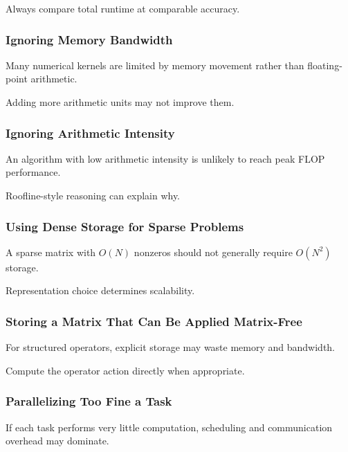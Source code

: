 Always compare total runtime at comparable accuracy.

\subsubsection{Ignoring Memory Bandwidth}

Many numerical kernels are limited by memory movement rather than floating-
point arithmetic.

Adding more arithmetic units may not improve them.

\subsubsection{Ignoring Arithmetic Intensity}

An algorithm with low arithmetic intensity is unlikely to reach peak FLOP
performance.

Roofline-style reasoning can explain why.

\subsubsection{Using Dense Storage for Sparse Problems}

A sparse matrix with \(O(N)\) nonzeros should not generally require
\(O(N^2)\) storage.

Representation choice determines scalability.

\subsubsection{Storing a Matrix That Can Be Applied Matrix-Free}

For structured operators, explicit storage may waste memory and bandwidth.

Compute the operator action directly when appropriate.

\subsubsection{Parallelizing Too Fine a Task}

If each task performs very little computation, scheduling and communication
overhead may dominate.

